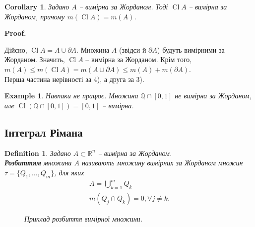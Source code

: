 \documentclass[a4paper, 10pt]{article}
\makeatletter
\def\qed{$\blacksquare$}
\theoremstyle{theoremdd}
\theoremstyle{theoremdd}
\newtheorem{definition}[theorem]{Definition}
\theoremstyle{theoremdd}
\theoremstyle{theoremdd}
\theoremstyle{theoremdd}
\newtheorem{example}[theorem]{Example}
\theoremstyle{theoremdd}
\theoremstyle{theoremdd}
\theoremstyle{theoremdd}
\theoremstyle{theoremdd}
\theoremstyle{theoremdd}
\theoremstyle{theoremdd}
\theoremstyle{theoremdd}
\theoremstyle{theoremdd}
\theoremstyle{theoremdd}
\newtheorem{corollary}[theorem]{Corollary}
\theoremstyle{theoremdd}
\renewenvironment{proof}[1][Proof.\\]{\par
\pushQED{\hfill \qed}%
\normalfont \topsep6\p@\@plus6\p@\relax
\trivlist
\item\relax
{\bfseries
#1\@addpunct{.}}\hspace\labelsep\ignorespaces
}{%
\popQED\endtrivlist\@endpefalse
}
\DeclareMathOperator{\Int}{Int}
\DeclareMathOperator{\Cl}{Cl}
\makeatother
\begin{document}
\begin{corollary}
Задано $A$ -- вимірна за Жорданом. Тоді $\Cl A$ -- вимірна за Жорданом, причому $m(\Cl A) = m(A)$.
\end{corollary}

\begin{proof}
Дійсно, $\Cl A = A \cup \partial A$. Множина $A$ (звідси й $\partial A$) будуть вимірними за Жорданом. Значить, $\Cl A$ -- вимірна за Жорданом. Крім того,\\
$m(A) \leq m(\Cl A) = m(A \cup \partial A) \leq m(A) + m(\partial A)$.\\
Перша частина нерівності за 4), а друга за 3).
\end{proof}

\begin{example}
Навпаки не працює. Множина $\mathbb{Q} \cap [0,1]$ не вимірна за Жорданом, але $\Cl (\mathbb{Q} \cap [0,1]) = [0,1]$ -- вимірна.
\end{example}

\iffalse
\begin{corollary}
Задано $A$ -- вимірна за Жорданом. Тоді $\Int A$ -- вимірна за Жорданом, причому $m(\Int A) = m(A)$.
\end{corollary}

\begin{proof}
Дійсно, $\Int A = A \setminus \partial A$. Множина $A$ (звідси й $\partial A$) будуть вимірними за Жорданом. Значить, $\Cl A$ -- вимірна за Жорданом. Крім того,\\
$m(A) \geq m(\Int A) = m(A \setminus \partial A)$
\end{proof}
\fi

\subsection{Інтеграл Рімана}
\begin{definition}
Задано $A \subset \mathbb{R}^n$ -- вимірна за Жорданом.\\
\textbf{Розбиттям} множини $A$ називають множину вимірних за Жорданом множин $\tau = \{Q_1,\dots,Q_m\}$, для яких
\begin{align*}
A = \bigcup_{k=1}^m Q_k \\
m(Q_j \cap Q_k) = 0, \forall j \neq k.
\end{align*}
\begin{figure}[H]
\centering
{}
\caption*{Приклад розбиття вимірної множини.}
\end{figure}
\end{definition}
\end{document}
